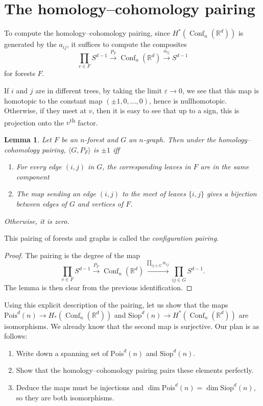 \documentclass{shortart}
\newtheorem{lemma}[thm]{Lemma}
\theoremstyle{definition}
\DeclareMathOperator\Conf{Conf}
\newcommand\R{\mathbb{R}}
\newcommand\Pois{\mathrm{Pois}}
\newcommand\Siop{\mathrm{Siop}}
\begin{document}
\section{The homology--cohomology pairing}
To compute the homology--cohomology pairing, since $H^*(\Conf_n(\R^d))$ is generated by the $a_{ij}$, it suffices to compute the composites
\[
  \prod_{v \in F} S^{d - 1} \overset{P_F}{\longrightarrow} \Conf_n(\R^d) \overset{\alpha_{ij}}{\longrightarrow} S^{d - 1}
\]
for forests $F$.

If $i$ and $j$ are in different trees, by taking the limit $\varepsilon \to 0$, we see that this map is homotopic to the constant map $(\pm 1, 0, \ldots, 0)$, hence is nullhomotopic. Otherwise, if they meet at $v$, then it is easy to see that up to a sign, this is projection onto the $v$\textsuperscript{th} factor.

\begin{lemma}
  Let $F$ be an $n$-forest and $G$ an $n$-graph. Then under the homology--cohomology pairing, $\langle G, P_F\rangle$ is $\pm 1$ iff
  \begin{enumerate}
    \item For every edge $(i, j)$ in $G$, the corresponding leaves in $F$ are in the same component
    \item The map sending an edge $(i, j)$ to the meet of leaves $\{i, j\}$ gives a bijection between edges of $G$ and vertices of $F$.
  \end{enumerate}
  Otherwise, it is zero.
\end{lemma}
This pairing of forests and graphs is called the \emph{configuration pairing}.

\begin{proof}
  The pairing is the degree of the map
  \[
    \prod_{v \in F} S^{d - 1} \overset{P_F}{\longrightarrow} \Conf_n(\R^d) \overset{\prod\limits_{ij \in G} \alpha_{ij}}{\longrightarrow} \prod_{ij \in G} S^{d - 1}.
  \]
  The lemma is then clear from the previous identification.
\end{proof}

Using this explicit description of the pairing, let us show that the maps $\Pois^d(n) \to H_*(\Conf_n(\R^d))$ and $\Siop^d(n) \to H^*(\Conf_n(\R^d))$ are isomorphisms. We already know that the second map is surjective. Our plan is as follows:
\begin{enumerate}
  \item Write down a spanning set of $\Pois^d(n)$ and $\Siop^d(n)$.
  \item Show that the homology--cohomology pairing pairs these elements perfectly.
  \item Deduce the maps must be injections and $\dim \Pois^d(n) = \dim \Siop^d(n)$, so they are both isomorphisms.
\end{enumerate}
\end{document}
